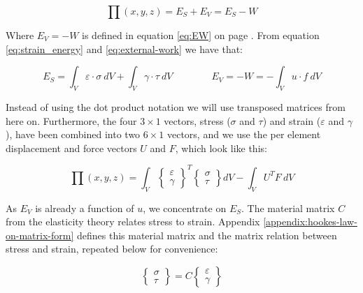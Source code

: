 \begin{equation}
\prod (x,y,z) = E_S + E_V = E_S - W
\end{equation}

Where $E_V = -W$ is defined in equation
\eqref{eq:EW} on page \pageref{eq:EW}. From equation
\eqref{eq:strain_energy} and \eqref{eq:external-work} we have that:

\begin{equation*}
E_S =  \int_V \varepsilon \cdot \sigma \ dV
+ \int_V \gamma \cdot \tau \ dV
\qquad \qquad E_V = - W = - \int_V u \cdot f \ dV
\end{equation*}

Instead of using the dot product notation we will use transposed
matrices from here on. Furthermore, the four $3 \times 1$ vectors,
stress ($\sigma$ and $\tau$) and strain ($\varepsilon$ and $\gamma$),
have been combined into two $6 \times 1$ vectors, and we use the per
element displacement and force vectors $U$ and $F$, which look like
this:

\begin{equation}
\prod (x,y,z) =  \int_V 
\begin{Bmatrix}
\varepsilon \\
\gamma
\end{Bmatrix}
^T
\begin{Bmatrix}
\sigma \\
\tau
\end{Bmatrix}
dV - \int_V U^T F \ dV
\end{equation}

As $E_V$ is already a function of $u$, we concentrate on $E_S$.
The material matrix $C$ from the elasticity theory relates
stress to strain. Appendix \ref{appendix:hookes-law-on-matrix-form}
defines this material matrix and the matrix relation between stress
and strain, repeated below for convenience:

\begin{equation*}
\begin{Bmatrix}
\sigma \\
\tau
\end{Bmatrix}
= C 
\begin{Bmatrix}
\varepsilon \\
\gamma
\end{Bmatrix}
\end{equation*}

